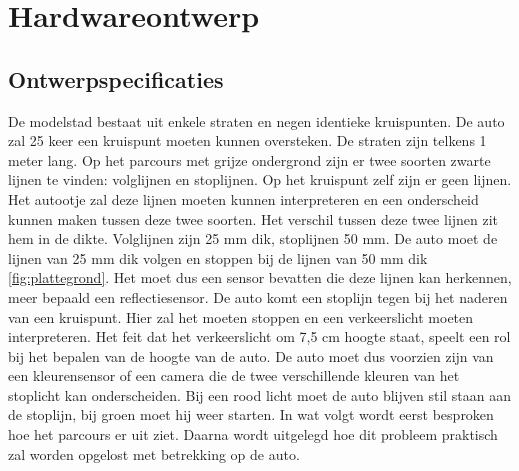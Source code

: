 \documentclass[a4paper,twoside,kulak]{kulakreport} %
\begin{document}
\section{Hardwareontwerp} \label{Hardwareontwerp}

\subsection{Ontwerpspecificaties} \label{Ontwerpspecificaties}


De modelstad bestaat uit enkele straten en negen identieke kruispunten. De auto zal 25 keer een kruispunt moeten kunnen oversteken. De straten zijn telkens 1 meter lang. Op het parcours met grijze ondergrond zijn er twee soorten zwarte lijnen te vinden: volglijnen en stoplijnen. Op het kruispunt zelf zijn er geen lijnen. Het autootje zal deze lijnen moeten kunnen interpreteren en een onderscheid kunnen maken tussen deze twee soorten. Het verschil tussen deze twee lijnen zit hem in de dikte. Volglijnen zijn 25 mm dik, stoplijnen 50 mm. De auto moet de lijnen van 25 mm dik volgen en stoppen bij de lijnen van 50 mm dik \ref{fig:plattegrond}. Het moet dus een sensor bevatten die deze lijnen kan herkennen, meer bepaald een reflectiesensor. De auto komt een stoplijn tegen bij het naderen van een kruispunt. Hier zal het moeten stoppen en een verkeerslicht moeten interpreteren. Het feit dat het verkeerslicht om 7,5 cm hoogte staat, speelt een rol bij het bepalen van de hoogte van de auto. De auto moet dus voorzien zijn van een kleurensensor of een camera die de twee verschillende kleuren van het stoplicht kan onderscheiden. Bij een rood licht moet de auto blijven stil staan aan de stoplijn, bij groen moet hij weer starten.
In wat volgt wordt eerst besproken hoe het parcours er uit ziet. Daarna wordt uitgelegd hoe dit probleem praktisch zal worden opgelost met betrekking op de auto.
\end{document}
